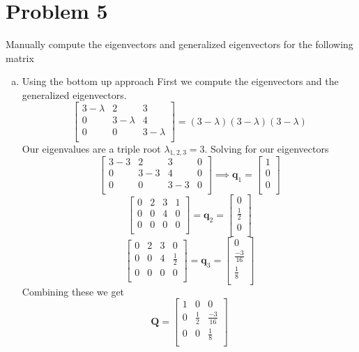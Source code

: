 \documentclass{article}
\begin{document}
\section*{Problem 5}
Manually compute the eigenvectors and generalized eigenvectors for the following matrix
\begin{enumerate}[a)]
\item Using the bottom up approach
\newline
\newline
First we compute the eigenvectors and the generalized eigenvectors.
$$
\begin{bmatrix}
3-\lambda & 2 & 3 \\
0 & 3-\lambda & 4 \\
0 & 0 & 3-\lambda \\
\end{bmatrix}
=
(3-\lambda)(3-\lambda)(3-\lambda)
$$
Our eigenvalues are a triple root $\lambda_{1,2,3} = 3$. Solving for our eigenvectors
$$
\left[
\begin{array}{ccc|c}
3-3 & 2 & 3 & 0 \\
0 & 3-3 & 4 & 0 \\
0 & 0 & 3-3 & 0 \\
\end{array}
\right]
\implies
\mathbf{q}_1
=
\begin{bmatrix}
1 \\
0 \\
0 \\
\end{bmatrix}
$$
$$
\left[
\begin{array}{ccc|c}
0 & 2 & 3 & 1 \\
0 & 0 & 4 & 0 \\
0 & 0 & 0 & 0 \\
\end{array}
\right]
=
\mathbf{q}_2
=
\begin{bmatrix}
0 \\
\frac{1}{2} \\
0 \\
\end{bmatrix}
$$
$$
\left[
\begin{array}{ccc|c}
0 & 2 & 3 & 0 \\
0 & 0 & 4 & \frac{1}{2} \\
0 & 0 & 0 & 0 \\
\end{array}
\right]
=
\mathbf{q}_3
=
\begin{bmatrix}
0 \\
\frac{-3}{16} \\
\frac{1}{8}\\
\end{bmatrix}
$$
Combining these we get
$$
\mathbf{Q}
=
\begin{bmatrix}
1 & 0 & 0 \\
0 & \frac{1}{2} & \frac{-3}{16} \\
0 & 0 & \frac{1}{8} \\
\end{bmatrix}
$$


\end{enumerate}
\end{document}
